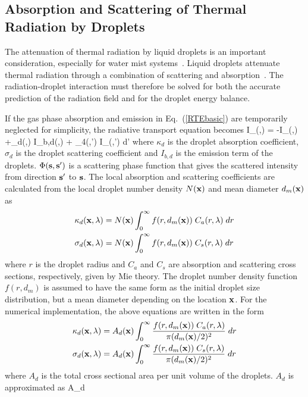 \documentclass[11pt]{book}
\begin{document}
\subsection{Absorption and Scattering of Thermal Radiation by Droplets}

The attenuation of thermal radiation by liquid droplets is an
important consideration, especially for water mist
systems~\cite{Ravigururajan:1}.  Liquid droplets attenuate thermal
radiation through a combination of scattering and
absorption~\cite{Tuntomo:1}.  The radiation-droplet interaction must
therefore be solved for both the accurate prediction of the radiation
field and for the droplet energy balance.

If the gas phase absorption and emission in Eq.~(\ref{RTEbasic})
are temporarily neglected for simplicity, the radiative transport
equation becomes
\be \bs \cdot \nabla I_{\la}(\bx,\bs) = -
I_{\la}(\bx,\bs) +\kappa_d(\bx,\la) \; I_{b,d}(\bx,\la) +
\int_{4\pi}\Phi(\bs,\bs') \; I_{\la}(\bx,\bs') \; d\bs'
\label{RTEspray} \ee
where $\kappa_d$ is the droplet absorption coefficient, $\sigma_d$ is the
droplet scattering coefficient and $I_{b,d}$ is the emission
term of the droplets. $\Phi({\bf s},{\bf s}')$ is a scattering phase function
that gives the scattered intensity from direction ${\bf s}'$ to ${\bf s}$.
The local absorption and scattering coefficients are calculated
from the local droplet number density $N({\bf x})$ and mean diameter $d_m({\bf x})$ as
\begin{align}
\kappa_d({\bf x},\lambda) &= N({\bf x})\int_0^\infty f(r,d_m({\bf x})) \; C_a(r,\lambda) \; dr \\
\sigma_d({\bf x},\lambda) &= N({\bf x})\int_0^\infty f(r,d_m({\bf x})) \; C_s(r,\lambda) \; dr
\end{align}
where $r$ is the droplet radius and $C_a$ and $C_s$ are absorption and
scattering cross sections, respectively, given by Mie theory.
The droplet number density function $f(r,d_m)$ is assumed to have
the same form as the initial droplet size distribution, but a
mean diameter depending on the location ${\bf x}$. For the numerical
implementation, the above equations are written in the form
\begin{align}
\kappa_d({\bf x},\lambda) &= A_d({\bf x})\int_0^\infty \frac{f(r,d_m({\bf x})) \; C_a(r,\lambda)} {\pi(d_m({\bf x})/2)^2} \; dr \\
\sigma_d({\bf x},\lambda) &= A_d({\bf x})\int_0^\infty \frac{f(r,d_m({\bf x})) \; C_s(r,\lambda)} {\pi(d_m({\bf x})/2)^2} \; dr
\end{align}
where $A_d$ is the total cross sectional area per unit volume of the
droplets. $A_d$ is approximated as
\be
A_d \approx {}
\ee
\end{document}
